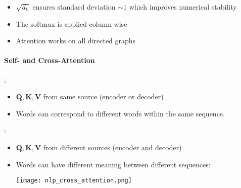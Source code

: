 \newpar{}
\begin{itemize}
    \item $\sqrt{d_k}$ ensures standard deviation $\sim 1$ which improves numerical stability
    \item The softmax is applied column wise
    \item Attention works on all directed graphs
\end{itemize}

\paragraph{Self- and Cross-Attention}

:

\begin{itemize}
    \item $\mathbf{Q,K,V}$ from same source (encoder or decoder)
    \item Words can correspond to different words within the same sequence.
\end{itemize}

\newpar{}
:

\begin{itemize}
    \item $\mathbf{Q,K,V}$ from different sources (encoder and decoder)
    \item Words can have different meaning between different sequences:
          \begin{center}
              \texttt{[image: nlp\_cross\_attention.png]}
          \end{center}
\end{itemize}

\newpar{}

